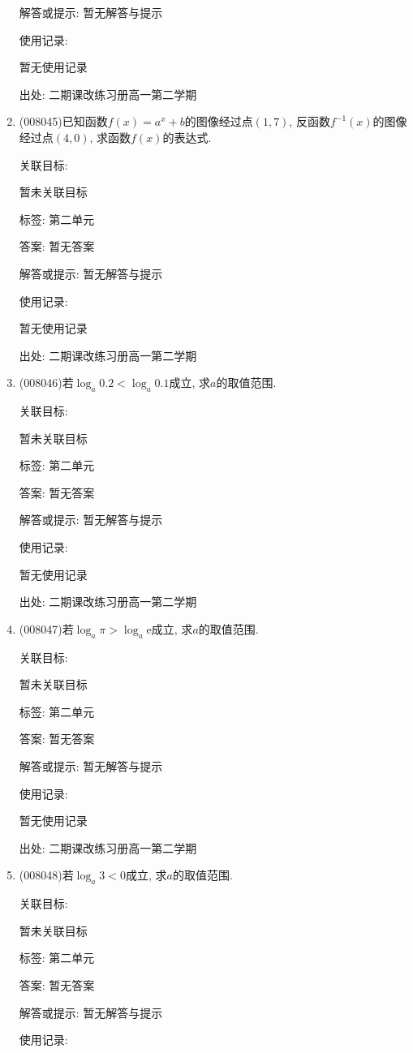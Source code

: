 \documentclass[10pt,a4paper]{article}
\begin{document}
\begin{enumerate}[1.]
解答或提示: 暂无解答与提示

使用记录:

暂无使用记录


出处: 二期课改练习册高一第二学期
\item { (008045)}已知函数$f(x)=a^x+b$的图像经过点$(1, 7)$, 反函数$f^{-1}(x)$的图像经过点$(4, 0)$, 求函数$f(x)$的表达式.


关联目标:

暂未关联目标



标签: 第二单元

答案: 暂无答案

解答或提示: 暂无解答与提示

使用记录:

暂无使用记录


出处: 二期课改练习册高一第二学期
\item { (008046)}若$\log _a0.2<\log _a0.1$成立, 求$a$的取值范围.


关联目标:

暂未关联目标



标签: 第二单元

答案: 暂无答案

解答或提示: 暂无解答与提示

使用记录:

暂无使用记录


出处: 二期课改练习册高一第二学期
\item { (008047)}若$\log _a\pi >\log _a\mathrm{e}$成立, 求$a$的取值范围.


关联目标:

暂未关联目标



标签: 第二单元

答案: 暂无答案

解答或提示: 暂无解答与提示

使用记录:

暂无使用记录


出处: 二期课改练习册高一第二学期
\item { (008048)}若$\log _a3<0$成立, 求$a$的取值范围.


关联目标:

暂未关联目标



标签: 第二单元

答案: 暂无答案

解答或提示: 暂无解答与提示

使用记录:


\end{enumerate}
\end{document}
